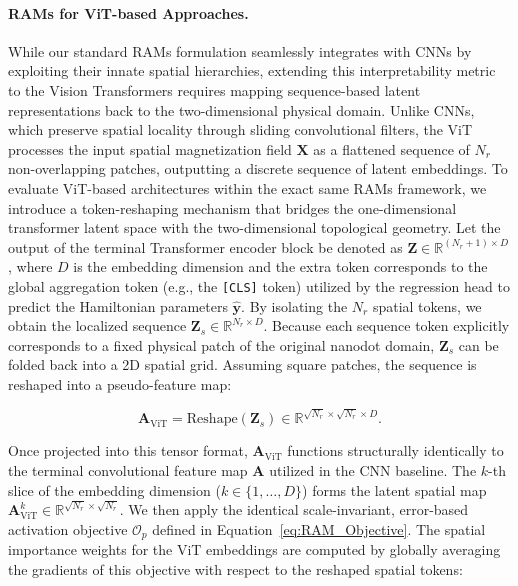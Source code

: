 \documentclass[letterpaper, 12, one column]{article}
\begin{document}
\paragraph{RAMs for ViT-based Approaches.}\label{sec:ViT_RAMs}
While our standard RAMs formulation seamlessly integrates with CNNs by exploiting their innate spatial hierarchies, extending this interpretability metric to the Vision Transformers requires mapping sequence-based latent representations back to the two-dimensional physical domain. Unlike CNNs, which preserve spatial locality through sliding convolutional filters, the ViT processes the input spatial magnetization field $\mathbf{X}$ as a flattened sequence of $N_r$ non-overlapping patches, outputting a discrete sequence of latent embeddings. To evaluate ViT-based architectures within the exact same RAMs framework, we introduce a token-reshaping mechanism that bridges the one-dimensional transformer latent space with the two-dimensional topological geometry. Let the output of the terminal Transformer encoder block be denoted as $\mathbf{Z} \in \mathbb{R}^{(N_r + 1) \times D}$, where $D$ is the embedding dimension and the extra token corresponds to the global aggregation token (e.g., the \texttt{[CLS]} token) utilized by the regression head to predict the Hamiltonian parameters $\hat{\mathbf{y}}$. By isolating the $N_r$ spatial tokens, we obtain the localized sequence $\mathbf{Z}_s \in \mathbb{R}^{N_r \times D}$. Because each sequence token explicitly corresponds to a fixed physical patch of the original nanodot domain, $\mathbf{Z}_s$ can be folded back into a 2D spatial grid. Assuming square patches, the sequence is reshaped into a pseudo-feature map:

\begin{equation}\label{eq:ViT_Reshape}
\mathbf{A}_{\text{ViT}} = \text{Reshape}(\mathbf{Z}_s) \in \mathbb{R}^{\sqrt{N_r} \times \sqrt{N_r} \times D}.
\end{equation}

Once projected into this tensor format, $\mathbf{A}_{\text{ViT}}$ functions structurally identically to the terminal convolutional feature map $\mathbf{A}$ utilized in the CNN baseline. The $k$-th slice of the embedding dimension ($k \in \{1, \dots, D\}$) forms the latent spatial map $\mathbf{A}_{\text{ViT}}^k \in \mathbb{R}^{\sqrt{N_r} \times \sqrt{N_r}}$. We then apply the identical scale-invariant, error-based activation objective $\mathcal{O}_p$ defined in Equation~\ref{eq:RAM_Objective}. The spatial importance weights for the ViT embeddings are computed by globally averaging the gradients of this objective with respect to the reshaped spatial tokens:
\end{document}

